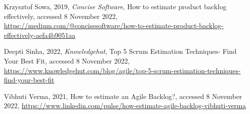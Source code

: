 {\begin{latin}
\begin{thebibliography}{9}
		Krzysztof Sowa,
		2019,
		\textit{Concise Software},
		How to estimate product backlog effectively, 
		accessed 8 November 2022,
		\url{https://medium.com/@concisesoftware/how-to-estimate-product-backlog-effectively-aefa4b9051aa}
		
		Deepti Sinha,
		2022,
		\textit{Knowledgehut},
		Top 5 Scrum Estimation Techniques- Find Your Best Fit, 
		accessed 8 November 2022,
		\url{https://www.knowledgehut.com/blog/agile/top-5-scrum-estimation-techniques-find-your-best-fit}
		
		Vibhuti Verma,
		2021,
		How to estimate an Agile Backlog?,
		accessed 8 November 2022,
		\url{	https://www.linkedin.com/pulse/how-estimate-agile-backlog-vibhuti-verma}

		
	\end{thebibliography}
	\endgroup
\end{latin}

}